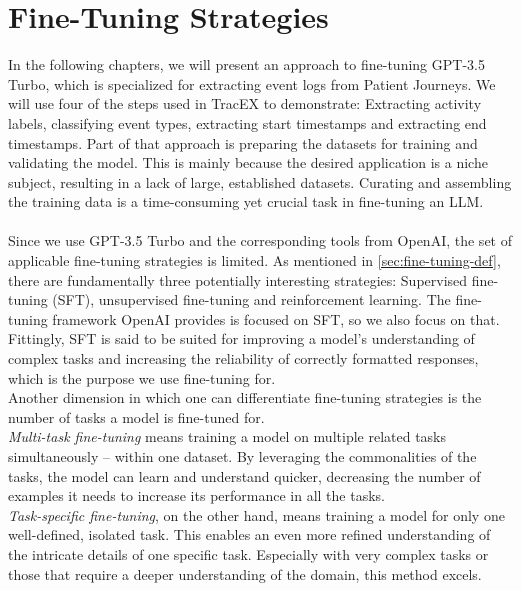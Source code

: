 \section{Fine-Tuning Strategies}\label{sec:fine}
In the following chapters, we will present an approach to fine-tuning GPT-3.5 Turbo, which is specialized for extracting event logs from Patient Journeys. We will use four of the steps used in TracEX to demonstrate: Extracting activity labels, classifying event types, extracting start timestamps and extracting end timestamps. Part of that approach is preparing the datasets for training and validating the model. This is mainly because the desired application is a niche subject, resulting in a lack of large, established datasets. Curating and assembling the training data is a time-consuming yet crucial task in fine-tuning an LLM.\\\\
Since we use GPT-3.5 Turbo and the corresponding tools from OpenAI, the set of applicable fine-tuning strategies is limited. As mentioned in \ref{sec:fine-tuning-def}, there are fundamentally three potentially interesting strategies: Supervised fine-tuning (SFT), unsupervised fine-tuning and reinforcement learning. The fine-tuning framework OpenAI provides is focused on SFT, so we also focus on that. Fittingly, SFT is said to be suited for improving a model's understanding of complex tasks and increasing the reliability of correctly formatted responses, which is the purpose we use fine-tuning for.\\
Another dimension in which one can differentiate fine-tuning strategies is the number of tasks a model is fine-tuned for.\\
\emph{Multi-task fine-tuning} means training a model on multiple related tasks simultaneously – within one dataset. By leveraging the commonalities of the tasks, the model can learn and understand quicker, decreasing the number of examples it needs to increase its performance in all the tasks.~\cite{pilault_conditionally_2020}\\
\emph{Task-specific fine-tuning}, on the other hand, means training a model for only one well-defined, isolated task. This enables an even more refined understanding of the intricate details of one specific task. Especially with very complex tasks or those that require a deeper understanding of the domain, this method excels.~\cite{xinxi_single_2021}\\\\
